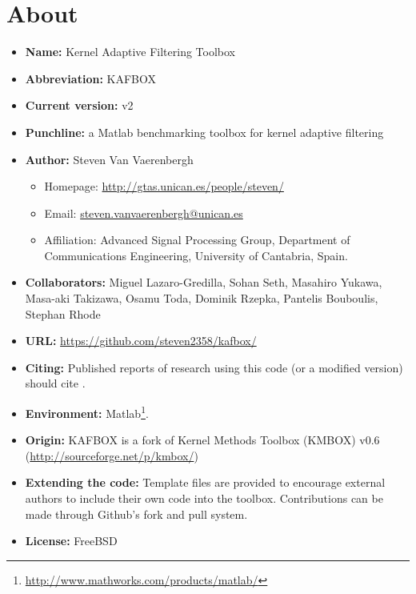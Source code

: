 \documentclass[]{report}
\begin{document}
\begin{itemize}
\end{itemize}



\chapter{About}
\begin{itemize}
\item {\bf Name:} Kernel Adaptive Filtering Toolbox
\item {\bf Abbreviation:} KAFBOX
\item {\bf Current version:} v2
\item {\bf Punchline:} a Matlab benchmarking toolbox for kernel adaptive filtering
\item {\bf Author:} Steven Van Vaerenbergh
  \begin{itemize}
  \item Homepage: \url{http://gtas.unican.es/people/steven/}
  \item Email: \url{steven.vanvaerenbergh@unican.es}
  \item Affiliation: Advanced Signal Processing Group, Department of Communications Engineering, University of Cantabria, Spain.
  \end{itemize}
\item {\bf Collaborators:} Miguel Lazaro-Gredilla, Sohan Seth, Masahiro Yukawa, Masa-aki Takizawa, Osamu Toda, Dominik Rzepka, Pantelis Bouboulis, Stephan Rhode
\item {\bf URL:} \url{https://github.com/steven2358/kafbox/}
\item {\bf Citing:} Published reports of research using this code (or a modified version) should cite \cite{vanvaerenbergh2013comparative}.
\item {\bf Environment:} Matlab\footnote{\url{http://www.mathworks.com/products/matlab/}}.
\item {\bf Origin:} KAFBOX is a fork of Kernel Methods Toolbox (KMBOX) v0.6 (\url{http://sourceforge.net/p/kmbox/})
\item {\bf Extending the code:} Template files are provided to encourage external authors to include their own code into the toolbox. Contributions can be made through Github's fork and pull system.
\item {\bf License:} FreeBSD
\end{itemize}





\end{document}
